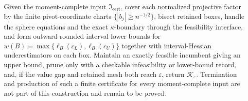 Given the moment-complete input \(\mathfrak I_{\mathrm{cert}}\), cover each normalized projective factor by the finite pivot-coordinate charts \(\{|b_j|\ge n^{-1/2}\}\), bisect retained boxes, handle the sphere equations and the exact \(\kappa\)-boundary through the feasibility interface, and form outward-rounded interval lower bounds for \(w(B)=\max\{\ell_B(c_L),\ell_B(c_U)\}\) together with interval-Hessian underestimators on each box. Maintain an exactly feasible incumbent giving an upper bound, prune only with a checkable infeasibility or lower-bound record, and, if the value gap and retained mesh both reach \(\varepsilon\), return \(\mathscr K_{\varepsilon}\). Termination and production of such a finite certificate for every moment-complete input are not part of this construction and remain to be proved.
